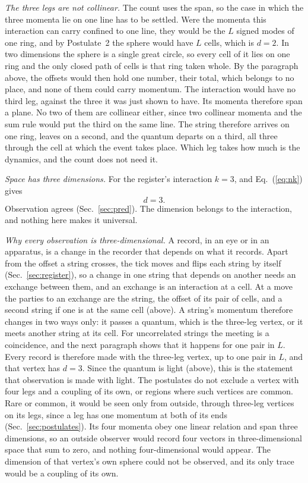 \documentclass[aps,prd,twocolumn,superscriptaddress,nofootinbib]{revtex4-2}
\begin{document}
\textit{The three legs are not collinear.} The count uses the span, so the case in which the three momenta lie on one line has to be settled. Were the momenta this interaction can carry confined to one line, they would be the $L$ signed modes of one ring, and by Postulate~2 the sphere would have $L$ cells, which is $d = 2$. In two dimensions the sphere is a single great circle, so every cell of it lies on one ring and the only closed path of cells is that ring taken whole. By the paragraph above, the offsets would then hold one number, their total, which belongs to no place, and none of them could carry momentum. The interaction would have no third leg, against the three it was just shown to have. Its momenta therefore span a plane. No two of them are collinear either, since two collinear momenta and the sum rule would put the third on the same line. The string therefore arrives on one ring, leaves on a second, and the quantum departs on a third, all three through the cell at which the event takes place. Which leg takes how much is the dynamics, and the count does not need it.

\textit{Space has three dimensions.} For the register's interaction $k = 3$, and Eq.~(\ref{eq:nk}) gives
\begin{equation}
d = 3 .
\label{eq:three}
\end{equation}
Observation agrees (Sec.~\ref{sec:pred}). The dimension belongs to the interaction, and nothing here makes it universal.

\textit{Why every observation is three-dimensional.} A record, in an eye or in an apparatus, is a change in the recorder that depends on what it records. Apart from the offset a string crosses, the tick moves and flips each string by itself (Sec.~\ref{sec:register}), so a change in one string that depends on another needs an exchange between them, and an exchange is an interaction at a cell. At a move the parties to an exchange are the string, the offset of its pair of cells, and a second string if one is at the same cell (above). A string's momentum therefore changes in two ways only: it passes a quantum, which is the three-leg vertex, or it meets another string at its cell. For uncorrelated strings the meeting is a coincidence, and the next paragraph shows that it happens for one pair in $L$. Every record is therefore made with the three-leg vertex, up to one pair in $L$, and that vertex has $d = 3$. Since the quantum is light (above), this is the statement that observation is made with light. The postulates do not exclude a vertex with four legs and a coupling of its own, or regions where such vertices are common. Rare or common, it would be seen only from outside, through three-leg vertices on its legs, since a leg has one momentum at both of its ends (Sec.~\ref{sec:postulates}). Its four momenta obey one linear relation and span three dimensions, so an outside observer would record four vectors in three-dimensional space that sum to zero, and nothing four-dimensional would appear. The dimension of that vertex's own sphere could not be observed, and its only trace would be a coupling of its own.
\end{document}
